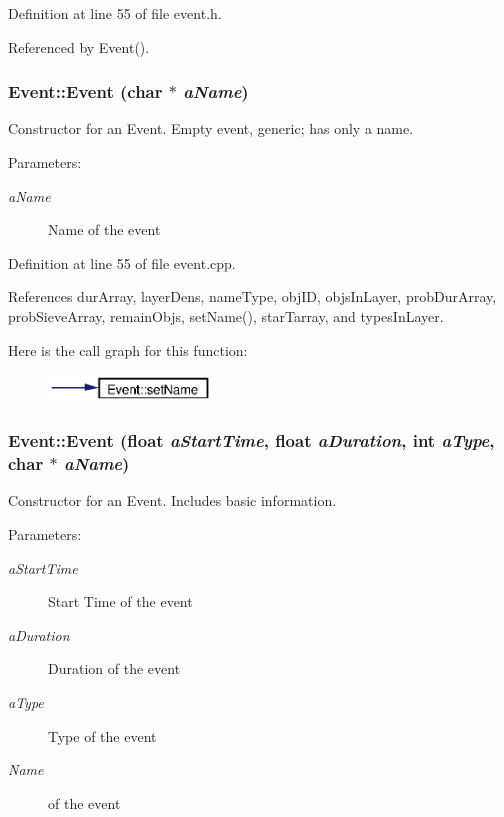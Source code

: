 Definition at line 55 of file event.h.

Referenced by Event().
\subsubsection{\setlength{\rightskip}{0pt plus 5cm}Event::Event (char $\ast$ {\em a\-Name})}\label{classEvent_a1}


Constructor for an Event. Empty event, generic; has only a name. \begin{Desc}
\item[Parameters:]
\begin{description}
\item[{\em a\-Name}]Name of the event \end{description}
\end{Desc}


Definition at line 55 of file event.cpp.

References dur\-Array, layer\-Dens, name\-Type, obj\-ID, objs\-In\-Layer, prob\-Dur\-Array, prob\-Sieve\-Array, remain\-Objs, set\-Name(), star\-Tarray, and types\-In\-Layer.

Here is the call graph for this function:\begin{figure}[H]
\begin{center}
\leavevmode
\includegraphics[width=123pt]{classEvent_a1_cgraph}
\end{center}
\end{figure}
\subsubsection{\setlength{\rightskip}{0pt plus 5cm}Event::Event (float {\em a\-Start\-Time}, float {\em a\-Duration}, int {\em a\-Type}, char $\ast$ {\em a\-Name})}\label{classEvent_a2}


Constructor for an Event. Includes basic information. \begin{Desc}
\item[Parameters:]
\begin{description}
\item[{\em a\-Start\-Time}]Start Time of the event \item[{\em a\-Duration}]Duration of the event \item[{\em a\-Type}]Type of the event \item[{\em Name}]of the event \end{description}
\end{Desc}


